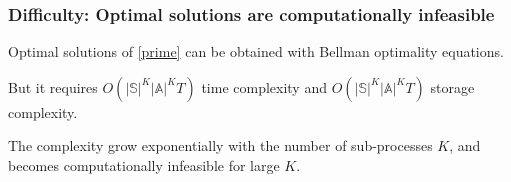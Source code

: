 \documentclass{beamer}
\newcommand{\substates}{\mathbb{S}}
\newcommand{\subactions}{\mathbb{A}}
\begin{document}

\begin{frame}[plain]
\frametitle{Difficulty: Optimal solutions are computationally infeasible}
Optimal solutions of \eqref{prime} can be obtained with Bellman optimality equations.

\vspace{0.5cm}
But it requires $O(|\substates|^K|\subactions|^KT)$ time complexity and $O(|\substates|^K|\subactions|^KT)$ storage complexity.

\vspace{0.5cm}
The complexity grow exponentially with the number of sub-processes $K$, and becomes computationally infeasible for large $K$.
\end{frame}

\end{document}
